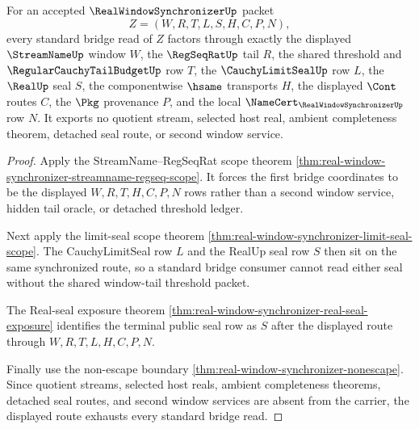 \begin{theorem}
\label{thm:real-window-synchronizer-standard-bridge-route}
For an accepted $\RealWindowSynchronizerUp$ packet
$$
Z=(W,R,T,L,S,H,C,P,N),
$$
every standard bridge read of $Z$ factors through exactly the displayed $\StreamNameUp$ window $W$, the $\RegSeqRatUp$ tail $R$, the shared threshold and $\RegularCauchyTailBudgetUp$ row $T$, the $\CauchyLimitSealUp$ row $L$, the $\RealUp$ seal $S$, the componentwise $\hsame$ transports $H$, the displayed $\Cont$ routes $C$, the $\Pkg$ provenance $P$, and the local $\NameCert_{\RealWindowSynchronizerUp}$ row $N$. It exports no quotient stream, selected host real, ambient completeness theorem, detached seal route, or second window service.
\end{theorem}
\begin{proof}
Apply the StreamName--RegSeqRat scope theorem \autoref{thm:real-window-synchronizer-streamname-regseq-scope}. It forces the first bridge coordinates to be the displayed $W,R,T,H,C,P,N$ rows rather than a second window service, hidden tail oracle, or detached threshold ledger.

Next apply the limit-seal scope theorem \autoref{thm:real-window-synchronizer-limit-seal-scope}. The CauchyLimitSeal row $L$ and the RealUp seal row $S$ then sit on the same synchronized route, so a standard bridge consumer cannot read either seal without the shared window-tail threshold packet.

The Real-seal exposure theorem \autoref{thm:real-window-synchronizer-real-seal-exposure} identifies the terminal public seal row as $S$ after the displayed route through $W,R,T,L,H,C,P,N$.

Finally use the non-escape boundary \autoref{thm:real-window-synchronizer-nonescape}. Since quotient streams, selected host reals, ambient completeness theorems, detached seal routes, and second window services are absent from the carrier, the displayed route exhausts every standard bridge read.
\end{proof}

